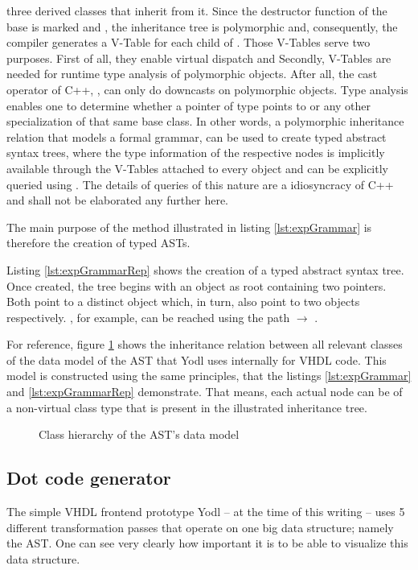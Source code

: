 three derived classes that inherit from it. Since the destructor
function of the base is marked  and , the
inheritance tree is polymorphic and, consequently, the compiler
generates a V-Table for each child of . Those V-Tables serve
two purposes. First of all, they enable virtual dispatch and Secondly,
V-Tables are needed for runtime type analysis of polymorphic objects.
After all, the cast operator of C++, , can only do
downcasts on polymorphic objects. Type analysis enables
one to determine whether a pointer of type  points to
 or any other specialization of that same base class. In
other words, a polymorphic inheritance relation that models a formal
grammar,
can be used to create typed abstract syntax trees, where the type
information of the respective nodes is implicitly available through the
V-Tables attached to every object and can be explicitly queried using
. The details of queries of this nature are a
idiosyncracy of C++ and shall not be elaborated any further here.

The main purpose of the method illustrated in listing
\ref{lst:expGrammar} is therefore the creation of typed ASTs.

Listing \ref{lst:expGrammarRep} shows the creation of a typed
abstract syntax tree. Once created, the tree begins with an
 object as
root containing two pointers. Both point to a distinct 
object which, in turn, also point to two  objects
respectively. , for example, can be reached using the
path  \(\to\) .

For reference, figure \ref{fig:classHier} shows the inheritance
relation between all
relevant classes of the data model of the AST that Yodl uses
internally for VHDL code. This model is
constructed using the same
principles, that the listings
\ref{lst:expGrammar} and \ref{lst:expGrammarRep} demonstrate.
That means, each actual node can be of a non-virtual class
type that is present in the illustrated inheritance tree.

\begin{figure}[p]
    \centering
    \caption{Class hierarchy of the AST's data model}
    
    \label{fig:classHier}
\end{figure}

\subsection{Dot code generator}
The simple VHDL frontend prototype Yodl -- at the time of this writing
-- uses 5 different
transformation passes that operate on one big data structure; namely
the AST. One can see very clearly how important it is to be able to
visualize this data structure.

